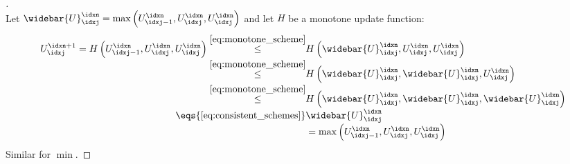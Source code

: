 \begin{proofbox}\nospacing
    \begin{proof}[]\label{proof:property:consistent_monotone_three_point_schemes}\leavevmode\\
        Let $\widebar{U}_{\idxj}^{\idxn}=\max\left(U_{\idxj-1}^{\idxn},U_{\idxj}^{\idxn},U_{\idxj}^{\idxn}\right)$ and
        let $H$ be a monotone update function:
        \begin{align*}
          U_{\idxj}^{\idxn+1}=H \left(U_{\idxj-1}^{\idxn},U_{\idxj}^{\idxn},U_{\idxj}^{\idxn}\right)
          \stackrel{\cref{eq:monotone_scheme}}{\leq}&H \left(\widebar{U}_{\idxj}^{\idxn},U_{\idxj}^{\idxn},U_{\idxj}^{\idxn}\right)\\[-1\jot]
          \stackrel{\cref{eq:monotone_scheme}}{\leq}&H \left(\widebar{U}_{\idxj}^{\idxn},\widebar{U}_{\idxj}^{\idxn},U_{\idxj}^{\idxn}\right)\\[-1\jot]
          \stackrel{\cref{eq:monotone_scheme}}{\leq}&H \left(\widebar{U}_{\idxj}^{\idxn},\widebar{U}_{\idxj}^{\idxn},\widebar{U}_{\idxj}^{\idxn}\right)\\[-1\jot]
          \eqs{\cref{eq:consistent_schemes}}&\widebar{U}_{\idxj}^{\idxn}\\[-1\jot]
                                            &=\max\left(U_{\idxj-1}^{\idxn},U_{\idxj}^{\idxn},U_{\idxj}^{\idxn}\right)
        \end{align*}
        Similar for $\min$.
    \end{proof}
\end{proofbox}
